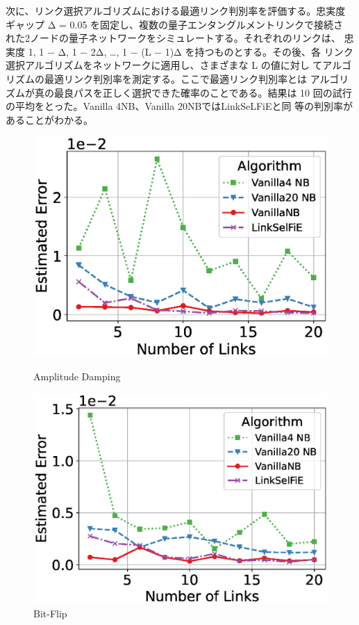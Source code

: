 \documentclass[technicalreport,dvipdfmx]{ieicej}
\begin{document}
次に、リンク選択アルゴリズムにおける最適リンク判別率を評価する。忠実度
ギャップ Δ = 0.05 を固定し、複数の量子エンタングルメントリンクで接続さ
れた2ノードの量子ネットワークをシミュレートする。それぞれのリンクは、
忠実度 1, 1 − Δ, 1 − 2Δ, …, 1 − (L − 1)Δ を持つものとする。その後、各
リンク選択アルゴリズムをネットワークに適用し、さまざまな L の値に対し
てアルゴリズムの最適リンク判別率を測定する。ここで最適リンク判別率とは
アルゴリズムが真の最良パスを正しく選択できた確率のことである。結果は
10 回の試行の平均をとった。Vanilla 4NB、Vanilla 20NBではLinkSeLFiEと同
等の判別率があることがわかる。
\begin{figure}[h]
\centering
\begin{minipage}[b]{0.45\columnwidth}
\centering
\includegraphics[width=\textwidth]{figure/plot_error_vs_path_num_AmplitudeDamping.eps}
\caption{\small Amplitude Damping}\end{minipage}
\hfill
\begin{minipage}[b]{0.45\columnwidth}
\centering
\includegraphics[width=\textwidth]{figure/plot_error_vs_path_num_BitFlip.eps}
\caption{\small Bit-Flip}\end{minipage}
\end{figure}
\end{document}
